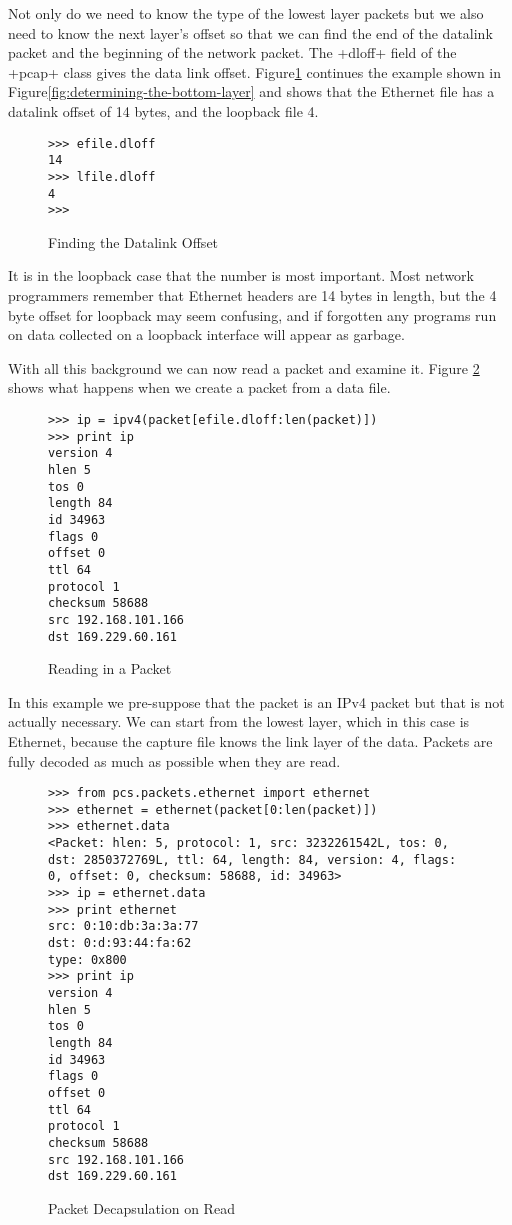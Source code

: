 \documentclass[11pt]{article}
\begin{document}
Not only do we need to know the type of the lowest layer packets but
we also need to know the next layer's offset so that we can find the
end of the datalink packet and the beginning of the network packet.
The \field+dloff+ field of the \class+pcap+ class gives the data link
offset.  Figure\ref{fig:finding-the-datalink-offset} continues the
example shown in Figure\ref{fig:determining-the-bottom-layer} and
shows that the Ethernet file has a datalink offset of 14 bytes, and
the loopback file 4. 

  \begin{figure}
    \centering
\begin{lstlisting}
>>> efile.dloff
14
>>> lfile.dloff
4
>>> 
\end{lstlisting}
    \caption{Finding the Datalink Offset}
    \label{fig:finding-the-datalink-offset}
  \end{figure}

It is in the loopback case that the number is most important.  Most
network programmers remember that Ethernet headers are 14 bytes in
length, but the 4 byte offset for loopback may seem confusing, and if
forgotten any programs run on data collected on a loopback interface
will appear as garbage.

With all this background we can now read a packet and examine it.
Figure \ref{fig:reading-in-a-packet} shows what happens when we create
a packet from a data file.  

\begin{figure}
  \centering
\begin{lstlisting}
>>> ip = ipv4(packet[efile.dloff:len(packet)])
>>> print ip
version 4
hlen 5
tos 0
length 84
id 34963
flags 0
offset 0
ttl 64
protocol 1
checksum 58688
src 192.168.101.166
dst 169.229.60.161
\end{lstlisting}
  \caption{Reading in a Packet}
  \label{fig:reading-in-a-packet}
\end{figure}

In this example we pre-suppose that the packet is an IPv4 packet but
that is not actually necessary.  We can start from the lowest layer,
which in this case is Ethernet, because the capture file knows the
link layer of the data.  Packets are fully decoded as much as possible
when they are read.  

\begin{figure}
  \centering
\begin{lstlisting}
>>> from pcs.packets.ethernet import ethernet
>>> ethernet = ethernet(packet[0:len(packet)])
>>> ethernet.data
<Packet: hlen: 5, protocol: 1, src: 3232261542L, tos: 0, dst: 2850372769L, ttl: 64, length: 84, version: 4, flags: 0, offset: 0, checksum: 58688, id: 34963>
>>> ip = ethernet.data
>>> print ethernet
src: 0:10:db:3a:3a:77
dst: 0:d:93:44:fa:62
type: 0x800
>>> print ip
version 4
hlen 5
tos 0
length 84
id 34963
flags 0
offset 0
ttl 64
protocol 1
checksum 58688
src 192.168.101.166
dst 169.229.60.161
\end{lstlisting}
  \caption{Packet Decapsulation on Read}
  \label{fig:packet-decapsulation-on-read}
\end{figure}
\end{document}
